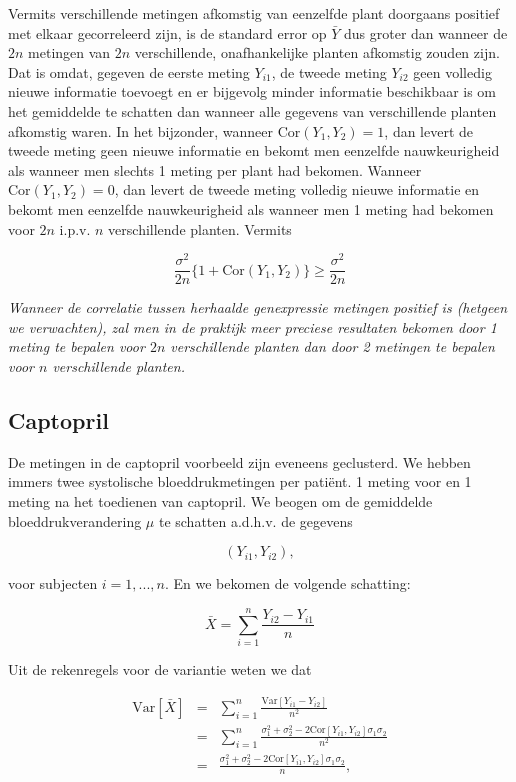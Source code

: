 \documentclass[
  12pt,dutch]{book}
\theoremstyle{definition}
\theoremstyle{definition}
\theoremstyle{definition}
\theoremstyle{definition}
\theoremstyle{remark}
\begin{document}
Vermits verschillende metingen afkomstig van eenzelfde plant doorgaans
positief met elkaar gecorreleerd zijn, is de standard error op \(\bar Y\) dus
groter dan wanneer de \(2n\) metingen van \(2n\) verschillende, onafhankelijke
planten afkomstig zouden zijn. Dat is omdat, gegeven de eerste meting \(Y_{i1}\), de tweede meting \(Y_{i2}\) geen volledig nieuwe informatie toevoegt en er bijgevolg minder informatie beschikbaar is om het gemiddelde te
schatten dan wanneer alle gegevens van verschillende planten afkomstig
waren. In het bijzonder, wanneer \(\text{Cor}(Y_{1},Y_{2})=1\), dan levert de tweede meting geen nieuwe informatie en bekomt men eenzelfde nauwkeurigheid als wanneer men slechts 1 meting per plant had bekomen. Wanneer \(\text{Cor}(Y_{1},Y_{2})=0\), dan levert de tweede meting volledig nieuwe informatie en bekomt men eenzelfde nauwkeurigheid als wanneer men 1 meting had bekomen voor \(2n\) i.p.v. \(n\) verschillende planten. Vermits

\[\frac{\sigma^2}{2n}\{1+\text{Cor}(Y_{1},Y_{2})\}\geq \frac{\sigma^2}{2n}\]

\emph{Wanneer de correlatie tussen herhaalde genexpressie metingen positief is (hetgeen we verwachten), zal men in de praktijk meer preciese resultaten bekomen door 1 meting te bepalen voor \(2n\) verschillende planten dan door 2 metingen te bepalen voor \(n\) verschillende planten.}

\subsection{Captopril}\label{captopril}

De metingen in de captopril voorbeeld zijn eveneens geclusterd. We hebben immers twee systolische bloeddrukmetingen per patiënt.
1 meting voor en 1 meting na het toedienen van captopril.
We beogen om de gemiddelde bloeddrukverandering \(\mu\) te schatten a.d.h.v. de gegevens

\[(Y_{i1} , Y_{i2}),\]

voor subjecten \(i = 1, ..., n\).
En we bekomen de volgende schatting:

\[\bar X = \sum_{i=1}^n \frac{Y_{i2}-Y_{i1}}{n}\]

Uit de rekenregels voor de variantie weten we dat

\begin{eqnarray*}
\text{Var}\left[\bar X\right]&=&\sum_{i=1}^n \frac{\text{Var}\left[Y_{i1}-Y_{i2}\right]}{n^2}\\
&=&\sum_{i=1}^n \frac{\sigma^2_1+\sigma^2_2-2\text{Cor}\left[Y_{i1},Y_{i2}\right]\sigma_1\sigma_2}{n^2}\\
&=&\frac{\sigma^2_1+\sigma^2_2-2\text{Cor}\left[Y_{i1},Y_{i2}\right]\sigma_1\sigma_2}{n},\\
\end{eqnarray*}
\end{document}
